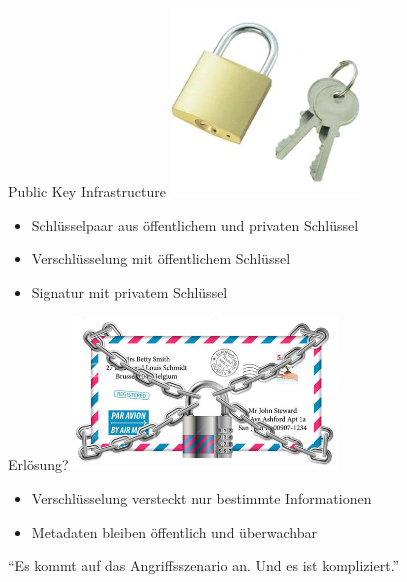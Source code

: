 \documentclass[aspectratio=1610]{beamer}
\renewcommand{\quote}[2]
{
  \begin{exampleblock}{}
    {\large “#1”}
    \vskip5mm
    \hspace*\fill{\small--- #2}
  \end{exampleblock}
}
\begin{document}
  \begin{frame}{Public Key Infrastructure}
    \includegraphics[width=5cm]{key.jpg}
    \pause
    \begin{itemize}
      \item Schlüsselpaar aus öffentlichem und privaten Schlüssel
      \pause
      \item Verschlüsselung mit öffentlichem Schlüssel
      \pause
      \item Signatur mit privatem Schlüssel
    \end{itemize}
  \end{frame}

  \begin{frame}{Erlösung?}
    \includegraphics[width=7cm]{mail.jpg}
    \pause
    \begin{itemize}
      \item Verschlüsselung versteckt nur bestimmte Informationen
      \item Metadaten bleiben öffentlich und überwachbar
    \end{itemize}
    \pause
    \quote{Es kommt auf das Angriffsszenario an. Und es ist kompliziert.}{}
  \end{frame}
\end{document}
